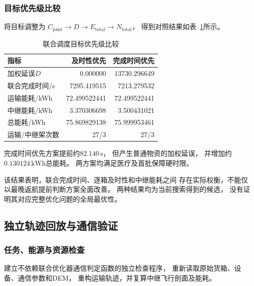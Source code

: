 \documentclass[bwprint]{gmcmthesis}
\begin{document}
\subsubsection{目标优先级比较}

将目标调整为
$C_{\mathrm{joint}}\rightarrow D\rightarrow
E_{\mathrm{total}}\rightarrow N_{\mathrm{total}}$，
得到对照结果如表~\ref{tab:q3_priorities}所示。

\begin{table}[htbp]
    \centering
    \caption{联合调度目标优先级比较}
    \label{tab:q3_priorities}
    \begin{tabular}{lrr}
        \toprule
        指标 & 及时性优先 & 完成时间优先 \\
        \midrule
        加权延误$D$ & 0.000000 & 13730.296649 \\
        联合完成时间/s & 7295.419515 & 7213.279532 \\
        运输能耗/kWh & 72.499522441 & 72.499522441 \\
        中继能耗/kWh & 3.370306698 & 3.500431021 \\
        总能耗/kWh & 75.869829138 & 75.999953461 \\
        运输/中继架次数 & 27/3 & 27/3 \\
        \bottomrule
    \end{tabular}
\end{table}

完成时间优先方案提前约$82.140\,\mathrm{s}$，
但产生普通物资的加权延误，
并增加约$0.130124\,\mathrm{kWh}$总能耗。
两方案均满足医疗及首批保障硬时限。

该结果表明，联合完成时间、逐箱及时性和中继能耗之间
存在实际权衡，不能仅以最晚返航提前判断方案全面改善。
两种结果均为当前搜索得到的候选，
没有证明其对应完整优化问题的全局最优性。

\subsection{独立轨迹回放与通信验证}

\subsubsection{任务、能源与资源检查}

建立不依赖联合优化器通信判定函数的独立检查程序，
重新读取原始货箱、设备、通信参数和DEM，
重构运输轨迹，并复算中继飞行剖面及能耗。
\end{document}
